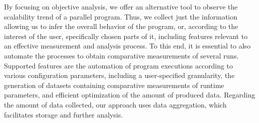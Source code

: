 
By focusing on objective analysis, we offer an alternative tool to observe the scalability trend of a parallel program. Thus, we collect just the information allowing us to infer the overall behavior of the program, or, according to the interest of the user, specifically chosen parts of it, including features relevant to an effective measurement and analysis process. 
To this end, it is essential to also automate the processes to obtain comparative measurements of several runs. 
Supported features are the automation of program executions according to various configuration parameters, including a user-specified granularity, the generation of datasets containing comparative measurements of runtime parameters, and efficient optimization of the amount of produced data.
Regarding the amount of data collected, our approach uses data aggregation, which facilitates storage and further analysis.


